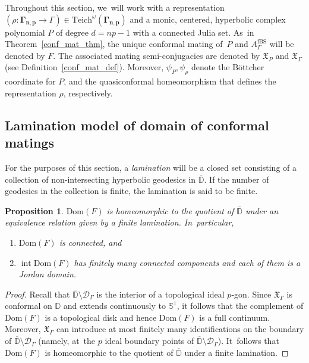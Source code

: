 \documentclass[JEP,XML,SOM,Unicode,NoFloatCountersInSection,published]{cedram}
\newtheorem{proposition}[lemma]{Proposition}
\theoremstyle{definition}
\theoremstyle{remark}
\newcommand{\D}{\mathbb{D}}
\DeclareMathOperator{\Int}{int}
\begin{document}
Throughout this section, we~will work with a representation $(\rho:\pmb{\Gamma_{n,p}}\to\Gamma)\in\mathrm{Teich}^\omega(\pmb{\Gamma_{n,p}})$ and a monic, centered, hyperbolic complex polynomial $P$ of degree $d=np-1$ with a connected Julia set. As~in Theorem~\ref{conf_mat_thm}, the unique conformal mating of~$P$ and $A_{\Gamma}^{\mathrm{fBS}}$ will be denoted by $F$. The associated mating semi-conjugacies are denoted by $\mathfrak{X}_P$ and $\mathfrak{X}_\Gamma$ (see Definition~\ref{conf_mat_def}). Moreover, $\psi_P, \psi_\rho$ denote the Böttcher coordinate for $P$, and the quasiconformal homeomorphism that defines the representation $\rho$, respectively.

\subsection{Lamination model of domain of conformal matings}\label{lami_model_subsec} For the purposes of this section, a \emph{lamination} will be a closed set consisting of a collection of non-intersecting hyperbolic geodesics in $\overline{\D}$. If the number of geodesics in the collection is finite, the lamination is said to be finite.

\begin{proposition}\label{mat_dom_prop}
$\mathrm{Dom}(F)$ is homeomorphic to the quotient of $\overline{\D}$ under an equivalence relation given by a finite lamination. In~particular,
\begin{enumerate}
\item $\mathrm{Dom}(F)$ is connected, and
\item $\Int{\mathrm{Dom}(F)}$ has finitely many connected components and each of them is a Jordan domain.
\end{enumerate}
\end{proposition}
\begin{proof}
Recall that $\overline{\D}\setminus \mathcal{D}_{\Gamma}$ is the interior of a topological ideal $p$-gon. Since $\mathfrak{X}_\Gamma$ is conformal on $\D$ and extends continuously to $\mathbb{S}^1$, it follows that the complement of $\mathrm{Dom}(F)$ is a topological disk and hence $\mathrm{Dom}(F)$ is a full continuum. Moreover, $\mathfrak{X}_\Gamma$ can introduce at most finitely many identifications on the boundary of $\overline{\D}\setminus \mathcal{D}_{\Gamma}$ (namely, at~the $p$ ideal boundary points of $\overline{\D}\setminus \mathcal{D}_{\Gamma}$). It~follows that $\mathrm{Dom}(F)$ is homeomorphic to the quotient of $\overline{\D}$ under a finite lamination.
\end{proof}
\end{document}
